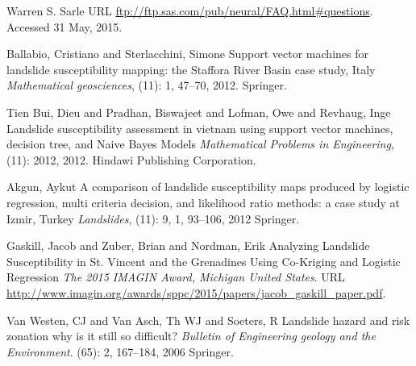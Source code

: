 \documentclass[11pt,twoside]{rmta2010esp}%
\begin{document}
\begin{thebibliography}{99}
Warren S. Sarle
\newblock URL
  \url{ftp://ftp.sas.com/pub/neural/FAQ.html#questions}.
  \newblock Accessed 31 May, 2015.


Ballabio, Cristiano and Sterlacchini, Simone
\newblock Support vector machines for landslide susceptibility mapping: the Staffora River Basin case study, Italy
\newblock \emph{Mathematical geosciences},
  (11): 1, 47--70, 2012.
\newblock Springer. 



Tien Bui, Dieu and Pradhan, Biswajeet and Lofman, Owe and Revhaug, Inge
\newblock Landslide susceptibility assessment in vietnam using support vector machines, decision tree, and Naive Bayes Models
\newblock \emph{Mathematical Problems in Engineering},
  (11): 2012, 2012.
\newblock Hindawi Publishing Corporation.



Akgun, Aykut
\newblock A comparison of landslide susceptibility maps produced by logistic regression, multi criteria decision, and likelihood ratio methods: a case study at Izmir, Turkey
\newblock \emph{Landslides},
  (11): 9, 1, 93--106, 2012
\newblock Springer. 


Gaskill, Jacob and Zuber, Brian and Nordman, Erik
\newblock Analyzing Landslide Susceptibility in St. Vincent and the Grenadines Using Co-Kriging and Logistic Regression
\newblock \emph{The 2015 IMAGIN Award, Michigan United States}.
\newblock URL
  \url{http://www.imagin.org/awards/sppc/2015/papers/jacob_gaskill_paper.pdf}.


Van Westen, CJ and Van Asch, Th WJ and Soeters, R
\newblock Landslide hazard and risk zonation why is it still so difficult?
\newblock \emph{Bulletin of Engineering geology and the Environment}.
(65): 2, 167--184, 2006
\newblock Springer. 







\end{thebibliography}
\end{document}

